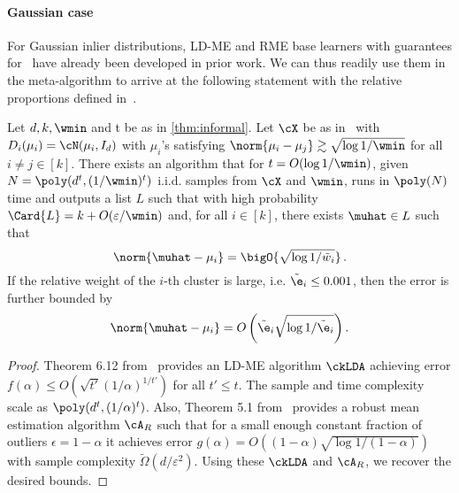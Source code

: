 \paragraph{Gaussian case}

\label{sec:comparison_prev_work}
For Gaussian inlier distributions, LD-ME and RME base learners with guarantees for~ have already been developed in prior work. We can thus readily use them in the meta-algorithm to arrive at the following statement with the relative proportions defined in~.
\begin{corollary}
\label{cor:gaussian}
  Let $d, k, \wmin$ and t be as in \cref{thm:informal}.
    Let \(\cX\) be as in~ with \(D_i(\mu_i) = \cN(\mu_i, I_d)\) with \(\mu_i\)'s satisfying 
    \(\norm{\mu_i - \mu_j} \gtrsim \sqrt{\log 1 / \wmin}\) for all $i \neq j \in [k]$. There exists an algorithm that for \(t = O(\log 1 / \wmin)\), given \(N =  \poly(d^t, (1 / \wmin)^t)\) i.i.d. samples from \(\cX\) and \(\wmin\), runs in \(\poly(N)\) time and outputs a list \(L\) such that with high probability \(\Card{L} = k + O(\varepsilon / \wmin)\) and, for all \(i \in [k]\), there exists \(\muhat \in L\) such that
    \[\norm{\muhat - \mu_i} 
    =  \bigO{\sqrt{\log 1 / \tilde w_i}}\,.
    \]
If the relative weight of the $i$-th cluster is large, i.e. \(\tilde \e_i \leq 0.001\), then the error is further bounded by  \[\norm{\muhat - \mu_i} = O\left(\tilde\e_i\sqrt{\log 1 / \tilde \e_i}\right).\] 
\end{corollary}

\begin{proof}
    Theorem 6.12 from~\citep{diakonikolas2023algorithmic} provides an LD-ME algorithm \(\ckLDA\)  achieving error \(f(\alpha) \le O(\sqrt{t'} (1 / \alpha)^{1/t'})\) for all \(t'\le t\). The sample and time complexity scale as \(\poly(d^t, (1/\alpha)^t)\).
    Also, Theorem 5.1 from~\citep{diakonikolas2019robust} provides a robust mean estimation algorithm \(\cA_{R}\) such that for a small enough constant fraction of outliers $\epsilon = 1-\alpha$ it achieves error \(g(\alpha) = O((1 - \alpha) \sqrt{\log 1 / (1 - \alpha)})\) with sample complexity \(\tilde \Omega(d / \varepsilon^2)\). 
    Using these \(\ckLDA\) and \(\cA_R\), we recover the desired bounds. 
\end{proof}

